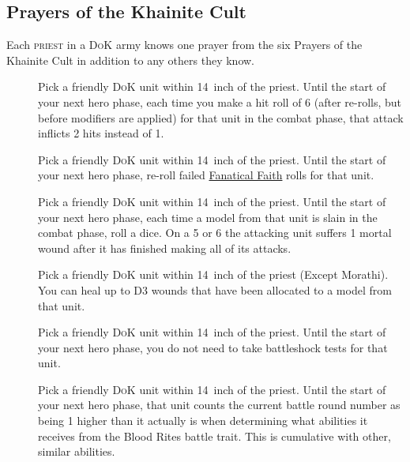 \hypertarget{prayers-of-the-khainite-cult}{%
    \subsection{Prayers of the Khainite Cult}\label{prayers-of-the-khainite-cult}}
Each \textsc{priest} in a \textsc{DoK} army knows one prayer from the six
Prayers of the Khainite Cult in addition to any others they know. 
\begin{description}
    \item [] Pick a friendly
        \textsc{DoK} unit within 14~inch of the priest. Until the start of your next
        hero phase, each time you make a hit roll of 6 (after re-rolls, but
        before modifiers are applied) for that unit in the combat phase, that
        attack inflicts 2 hits instead of 1.
    \item [] Pick a friendly
        \textsc{DoK} unit within 14~inch of the priest. Until the start of your next
        hero phase, re-roll failed \hyperref[fanatical-faith]{Fanatical Faith}
        rolls for that unit.
    \item [] Pick a friendly \textsc{DoK}
        unit within 14~inch of the priest. Until the start of your next hero
        phase, each time a model from that unit is slain in the combat phase,
        roll a dice. On a 5 or 6 the attacking unit suffers 1 mortal wound
        after it has finished making all of its attacks.
    \item [] Pick
        a friendly \textsc{DoK} unit within 14~inch of the priest (Except Morathi). You
        can heal up to D3 wounds that have been allocated to a model from that
        unit.
    \item []
        Pick a friendly \textsc{DoK} unit within 14~inch of the priest. Until the start
        of your next hero phase, you do not need to take battleshock tests for
        that unit.
    \item [] Pick a friendly
        \textsc{DoK} unit within 14~inch of the priest. Until the start of your next
        hero phase, that unit counts the current battle round number as being
        1 higher than it actually is when determining what abilities it
        receives from the Blood Rites battle trait. This is
        cumulative with other, similar abilities.
\end{description}

